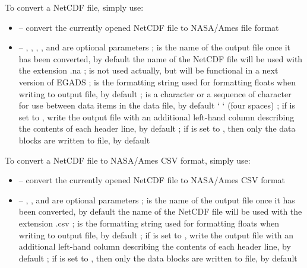 \documentclass[a4paper,10pt,openany,english]{sphinxmanual}
\begin{document}
To convert a NetCDF file, simply use:
\begin{itemize}
\item {} 
 -- convert the currently opened NetCDF file to NASA/Ames file format

\item {} 
 -- , , , ,  and  are optional parameters ;  is the name of the output file once it has been converted, by default the name of the NetCDF file will be used with the extension .na ;  is not used actually, but will be functional in a next version of EGADS ;  is the formatting string used for formatting floats when writing to output file, by default  ;  is a character or a sequence of character for use between data items in the data file, by default `    ` (four spaces) ; if  is set to , write the output file with an additional left-hand column describing the contents of each header line, by default  ; if  is set to , then only the data blocks are written to file, by default 

\end{itemize}

To convert a NetCDF file to NASA/Ames CSV format, simply use:
\begin{itemize}
\item {} 
 -- convert the currently opened NetCDF file to NASA/Ames CSV format

\item {} 
 -- , ,  and  are optional parameters ;  is the name of the output file once it has been converted, by default the name of the NetCDF file will be used with the extension .csv ;  is the formatting string used for formatting floats when writing to output file, by default  ; if  is set to , write the output file with an additional left-hand column describing the contents of each header line, by default  ; if  is set to , then only the data blocks are written to file, by default 

\end{itemize}
\end{document}
